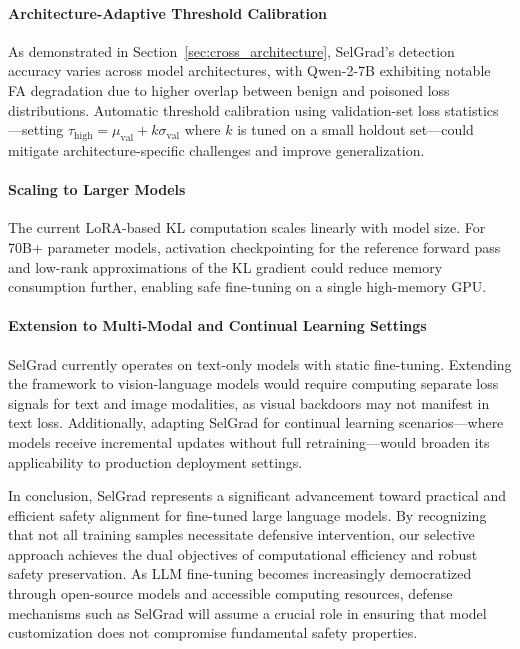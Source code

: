 \paragraph{Architecture-Adaptive Threshold Calibration}
As demonstrated in Section~\ref{sec:cross_architecture}, SelGrad's detection accuracy varies across model architectures, with Qwen-2-7B exhibiting notable FA degradation due to higher overlap between benign and poisoned loss distributions. Automatic threshold calibration using validation-set loss statistics---setting $\tau_{\text{high}} = \mu_{\text{val}} + k\sigma_{\text{val}}$ where $k$ is tuned on a small holdout set---could mitigate architecture-specific challenges and improve generalization.

\paragraph{Scaling to Larger Models}
The current LoRA-based KL computation scales linearly with model size. For 70B+ parameter models, activation checkpointing for the reference forward pass and low-rank approximations of the KL gradient could reduce memory consumption further, enabling safe fine-tuning on a single high-memory GPU.

\paragraph{Extension to Multi-Modal and Continual Learning Settings}
SelGrad currently operates on text-only models with static fine-tuning. Extending the framework to vision-language models would require computing separate loss signals for text and image modalities, as visual backdoors may not manifest in text loss. Additionally, adapting SelGrad for continual learning scenarios---where models receive incremental updates without full retraining---would broaden its applicability to production deployment settings.

In conclusion, SelGrad represents a significant advancement toward practical and efficient safety alignment for fine-tuned large language models. By recognizing that not all training samples necessitate defensive intervention, our selective approach achieves the dual objectives of computational efficiency and robust safety preservation. As LLM fine-tuning becomes increasingly democratized through open-source models and accessible computing resources, defense mechanisms such as SelGrad will assume a crucial role in ensuring that model customization does not compromise fundamental safety properties.

